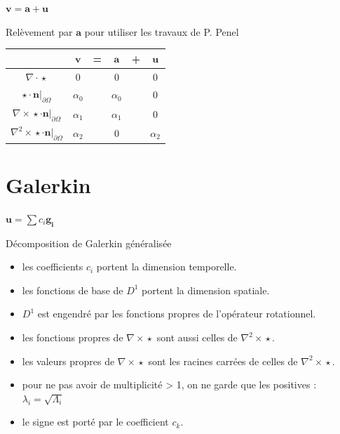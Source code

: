 \documentclass{beamer}
\newcommand{\rot}{{\nabla\times}}
\newcommand{\rott}{{\nabla^2\times}}
\renewcommand{\div}{{\nabla\cdot}}
\newcommand{\restr}{{\big\rvert_{\partial\Omega}}}
\begin{document}
\begin{frame}{$\mathbf{v}=\mathbf{a}+\mathbf{u}$}
\begin{block}{Relèvement par $\mathbf{a}$ pour utiliser les travaux de P. Penel}
\begin{center}
\begin{tabular}{c|ccccc}
& $\mathbf{v}$ & = & $\mathbf{a}$ & + & $\mathbf{u}$ \\ \hline
$\div\star$ & 0 & & 0 & & 0\\ \hline
$\star\cdot \mathbf{n}\restr$ & $\alpha_0$ & & $\alpha_0$ & & 0\\ \hline
$\rot\star\cdot \mathbf{n}\restr$ & $\alpha_1$ & & $\alpha_1$ & & 0\\\hline
$\rott\star\cdot \mathbf{n}\restr$ & $\alpha_2$ & & 0 & & $\alpha_2$ 
\end{tabular}
\end{center}
\end{block}
\end{frame}

\section{Galerkin}
\begin{frame}{$\mathbf{u}=\sum c_i\mathbf{g_i}$}
\begin{block}{Décomposition de Galerkin généralisée}
\begin{itemize}
\item les coefficients $c_i$ portent la dimension temporelle.
\item les fonctions de base de $D^1$ portent la dimension spatiale.
\item $D^1$ est engendré par les fonctions propres de l'opérateur rotationnel.
\item les fonctions propres de $\rot\star$ sont aussi celles de $\rott\star$.
\item les valeurs propres de $\rot\star$ sont les racines carrées de celles de $\rott\star$.
\item pour ne pas avoir de multiplicité > 1, on ne garde que les positives : $\lambda_i=\sqrt{\Lambda_i}$
\item le signe est porté par le coefficient $c_k$.
\end{itemize}
\end{block}
\end{frame}
\end{document}

